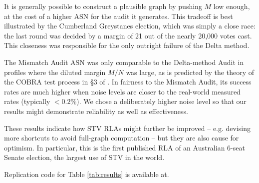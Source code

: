 It is generally possible to construct a plausible graph by pushing $M$ low enough, at the cost of a higher ASN for the audit it generates.
This tradeoff is best illustrated by the Cumberland Greystanes election, which was simply a close race: the last round was decided by a margin of 21 out of the nearly 20,000 votes cast.
This closeness was responsible for the only outright failure of the Delta method.

The Mismatch Audit ASN was only comparable to the Delta-method Audit in profiles where the diluted margin $M/N$ was large, as is predicted by the theory of the COBRA test process in \S 3 of \cite{spertusCOBRAComparisonOptimalBetting2023}.
In fairness to the Mismatch Audit, its success rates are much higher when noise levels are closer to the real-world measured rates (typically $<0.2\%$).
We chose a deliberately higher noise level so that our results might demonstrate reliability as well as effectiveness.

These results indicate how STV RLAs might further be improved -- e.g. devising more shortcuts to avoid full-graph computation -- but they are also cause for optimism. In particular, this is the first published RLA of an Australian 6-seat Senate election, the largest use of STV in the world.

Replication code for Table \ref{tab:results} is available at.
